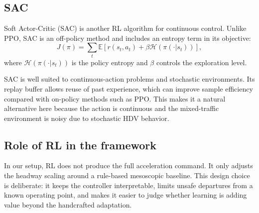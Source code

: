 \subsection{SAC}

Soft Actor-Critic (SAC) is another RL algorithm for continuous control. Unlike PPO, SAC is an off-policy method and includes an entropy term in its objective:
\[
J(\pi)
=
\sum_t
\mathbb{E}
\left[
r(s_t,a_t) + \beta \mathcal{H}(\pi(\cdot|s_t))
\right],
\]
where $\mathcal{H}(\pi(\cdot|s_t))$ is the policy entropy and $\beta$ controls the exploration level.

SAC is well suited to continuous-action problems and stochastic environments. Its replay buffer allows reuse of past experience, which can improve sample efficiency compared with on-policy methods such as PPO. This makes it a natural alternative here because the action is continuous and the mixed-traffic environment is noisy due to stochastic HDV behavior.

\subsection{Role of RL in the framework}

In our setup, RL does not produce the full acceleration command. It only adjusts the headway scaling around a rule-based mesoscopic baseline. This design choice is deliberate: it keeps the controller interpretable, limits unsafe departures from a known operating point, and makes it easier to judge whether learning is adding value beyond the handcrafted adaptation.
